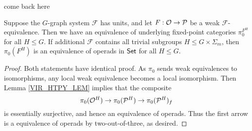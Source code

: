 \documentclass[a4paper,10pt
,draft
]{article}%
\renewcommand{\F}{\mathcal F}
\renewcommand{\1}{\eta}%
\begin{document}
come back here
\begin{corollary}
      Suppose the $G$-graph system $\F$ has units,
      and let $F: \mathcal{O} \to \mathcal{P}$ be a weak $\F$-equivalence.
      Then we have an equivalence of underlying fixed-point categories
      $\pi_0^{F^H}$ for all $H \leq G$.
      If additional $\F$ contains all trivial subgroups $H \leq G \times \Sigma_m$, then
      $\pi_0(F^H)$ is an equivalence of operads in $\mathsf{Set}$ for all $H \leq G$.
\end{corollary}
\begin{proof}
      Both statements have identical proof.
      As $\pi_0$ sends weak equivalences to isomorphisms, any local weak equivalence becomes a local isomorphism.
      Then Lemma \ref{VIR_HTPY_LEM} implies that the composite
      \[
            \pi_0(\mathcal{O}^H) \to \pi_0(\mathcal{P}^H) \to \pi_0(\mathcal{P}^H)_f
      \]
      is essentially surjective, and hence an equivalence of operads.
      Thus the first arrow is a equivalence of operads by two-out-of-three, as desired.
\end{proof}


  
\end{document}
